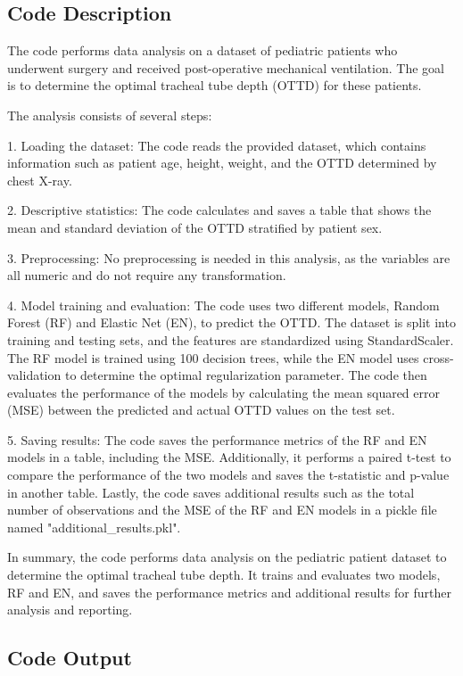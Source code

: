 \documentclass[11pt]{article}
\begin{document}
\subsection{Code Description}

The code performs data analysis on a dataset of pediatric patients who underwent surgery and received post-operative mechanical ventilation. The goal is to determine the optimal tracheal tube depth (OTTD) for these patients.

The analysis consists of several steps:

1. Loading the dataset: The code reads the provided dataset, which contains information such as patient age, height, weight, and the OTTD determined by chest X-ray.

2. Descriptive statistics: The code calculates and saves a table that shows the mean and standard deviation of the OTTD stratified by patient sex.

3. Preprocessing: No preprocessing is needed in this analysis, as the variables are all numeric and do not require any transformation.

4. Model training and evaluation: The code uses two different models, Random Forest (RF) and Elastic Net (EN), to predict the OTTD. The dataset is split into training and testing sets, and the features are standardized using StandardScaler. The RF model is trained using 100 decision trees, while the EN model uses cross-validation to determine the optimal regularization parameter. The code then evaluates the performance of the models by calculating the mean squared error (MSE) between the predicted and actual OTTD values on the test set.

5. Saving results: The code saves the performance metrics of the RF and EN models in a table, including the MSE. Additionally, it performs a paired t-test to compare the performance of the two models and saves the t-statistic and p-value in another table. Lastly, the code saves additional results such as the total number of observations and the MSE of the RF and EN models in a pickle file named "additional\_results.pkl".

In summary, the code performs data analysis on the pediatric patient dataset to determine the optimal tracheal tube depth. It trains and evaluates two models, RF and EN, and saves the performance metrics and additional results for further analysis and reporting.

\subsection{Code Output}
\end{document}
